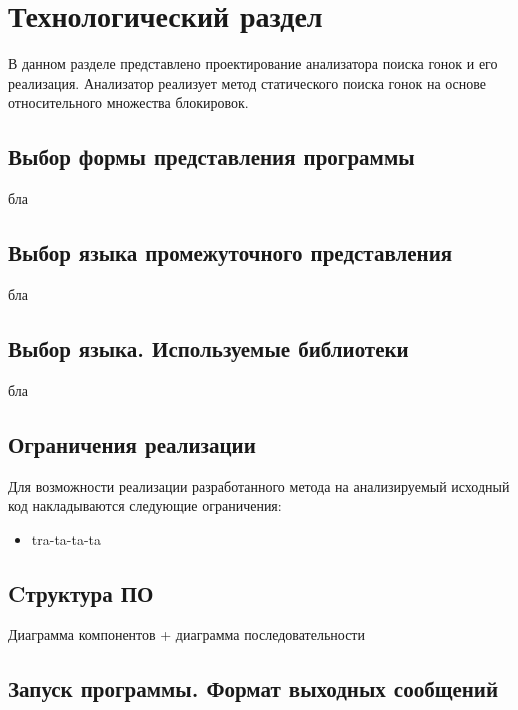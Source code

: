 \chapter{Технологический раздел}
\label{cha:impl}

В данном разделе представлено проектирование анализатора поиска гонок и его реализация. Анализатор реализует метод статического поиска гонок на основе относительного множества блокировок.

\section{Выбор формы представления программы}
бла

\section{Выбор языка промежуточного представления}
бла

\section{Выбор языка. Используемые библиотеки}
бла

\section{Ограничения реализации}

Для возможности реализации разработанного метода на анализируемый исходный код накладываются следующие ограничения:
\begin{itemize}
  \item tra-ta-ta-ta
\end{itemize}

\section{Cтруктура ПО}
Диаграмма компонентов + диаграмма последовательности

\section{Запуск программы. Формат выходных сообщений}

